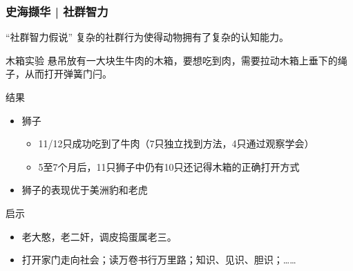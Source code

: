 \begin{frame}
  \frametitle{史海撷华 | 社群智力}
  \vspace{-0.5em}
  \begin{block}{“社群智力假说”}
    复杂的社群行为使得动物拥有了复杂的认知能力。
  \end{block}
  \vspace{-0.5em}
  \pause
  \begin{block}{木箱实验}
    悬吊放有一大块生牛肉的木箱，要想吃到肉，需要拉动木箱上垂下的绳子，从而打开弹簧门闩。
  \end{block}
  \vspace{-0.5em}
  \pause
  \begin{block}{结果}
    \begin{itemize}
      \item 狮子
        \begin{itemize}
          \item 11/12只成功吃到了牛肉（7只独立找到方法，4只通过观察学会）
          \item 5至7个月后，11只狮子中仍有10只还记得木箱的正确打开方式
        \end{itemize}
      \item 狮子的表现优于美洲豹和老虎
    \end{itemize}
  \end{block}
  \vspace{-0.5em}
  \pause
  \begin{block}{启示}
    \begin{itemize}
      \item 老大憨，老二奸，调皮捣蛋属老三。
      \item 打开家门走向社会；读万卷书行万里路；知识、见识、胆识；……
    \end{itemize}
  \end{block}
\end{frame}



